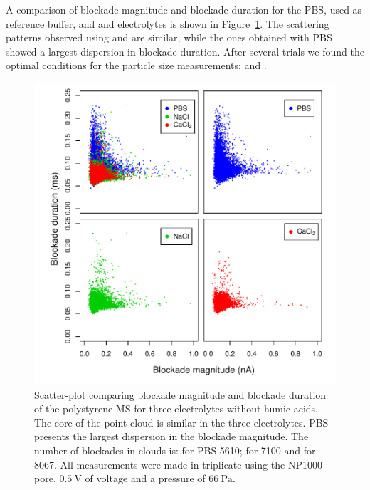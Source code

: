 \documentclass[journal=langd5,manuscript=article]{achemso}
\begin{document}
A comparison of blockade magnitude and blockade duration for the PBS, used as reference  buffer, and  and  electrolytes is shown in Figure~\ref{fgr:pairs_buffers}.
The scattering patterns observed using    and  are similar, while the ones obtained with PBS showed a largest dispersion in blockade duration. After several trials we found the optimal conditions for the particle size measurements:   and .
 \begin{figure}
  \includegraphics[width=\linewidth]{Figures/Raw_Pairs_buffers_MS_T0_Fwhm.pdf}
  \caption{Scatter-plot comparing  blockade magnitude and
  blockade duration of  the polystyrene MS for three
  electrolytes without humic acids. The core of the point cloud is similar in the three electrolytes. PBS  presents the largest dispersion in the blockade magnitude. The number of blockades in clouds is: for PBS 5610; for  7100 and for  8067. All measurements were made in triplicate using the NP1000 pore, $0.5~\mathrm{V}$ of voltage and a pressure of $66~\mathrm{Pa}$.} 
  \label{fgr:pairs_buffers}
\end{figure}
\end{document}
